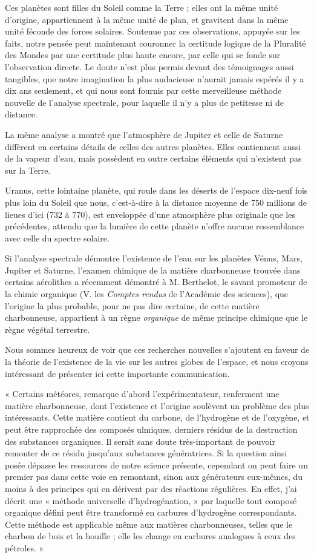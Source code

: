 \documentclass[a4paper, 11pt, oneside]{article}
\begin{document}
Ces planètes sont filles du Soleil comme la Terre ; elles ont la même unité d'origine, appartiennent à la même unité de plan, et gravitent dans la même unité féconde des forces solaires. Soutenue par ces observations, appuyée sur les faits, notre pensée peut maintenant couronner la certitude logique de la Pluralité des Mondes par une certitude plus haute encore, par celle qui se fonde sur l'observation directe. Le doute n'est plus permis devant des témoignages aussi tangibles, que notre imagination la plus audacieuse n'aurait jamais espérés il y a dix ans seulement, et qui nous sont fournis par cette merveilleuse méthode nouvelle de l'analyse spectrale, pour laquelle il n'y a plus de petitesse ni de distance.

La même analyse a montré que l'atmosphère de Jupiter et celle de Saturne diffèrent en certains détails de celles des autres planètes. Elles contiennent aussi de la vapeur d'eau, mais possèdent en outre certains éléments qui n'existent pas sur la Terre.

Uranus, cette lointaine planète, qui roule dans les déserts de l'espace dix-neuf fois plus loin du Soleil que nous, c'est-à-dire à la distance moyenne de 750 millions de lieues d'ici (732 à 770), est enveloppée d'une atmosphère plus originale que les précédentes, attendu que la lumière de cette planète n'offre aucune ressemblance avec celle du spectre solaire.

Si l'analyse spectrale démontre l'existence de l'eau sur les planètes Vénus, Mars, Jupiter et Saturne, l'examen chimique de la matière charbonneuse trouvée dans certains aérolithes a récemment démontré à M. Berthelot, le savant promoteur de la chimie organique (V. les \emph{Comptes rendus} de l'Académie des sciences), que l'origine la plus probable, pour ne pas dire certaine, de cette matière charbonneuse, appartient à un règne \emph{organique} de même principe chimique que le règne végétal terrestre.

Nous sommes heureux de voir que ces recherches nouvelles s'ajoutent en faveur de la théorie de l'existence de la vie sur les autres globes de l'espace, et nous croyons intéressant de présenter ici cette importante communication.

« Certains météores, remarque d'abord l'expérimentateur, renferment une matière charbonneuse, dont l'existence et l'origine soulèvent un problème des plus intéressants. Cette matière contient du carbone, de l'hydrogène et de l'oxygène, et peut être rapprochée des composés ulmiques, derniers résidus de la destruction des substances organiques. Il serait sans doute très-important de pouvoir remonter de ce résidu jusqu'aux substances génératrices. Si la question ainsi posée dépasse les ressources de notre science présente, cependant on peut faire un premier pas dans cette voie en remontant, sinon aux générateurs eux-mêmes, du moins à des principes qui en dérivent par des réactions régulières. En effet, j'ai décrit une « méthode universelle d'hydrogénation, » par laquelle tout composé organique défini peut être transformé en carbures d'hydrogène correspondants. Cette méthode est applicable même aux matières charbonneuses, telles que le charbon de bois et la houille ; elle les change en carbures analogues à ceux des pétroles. »
\end{document}
